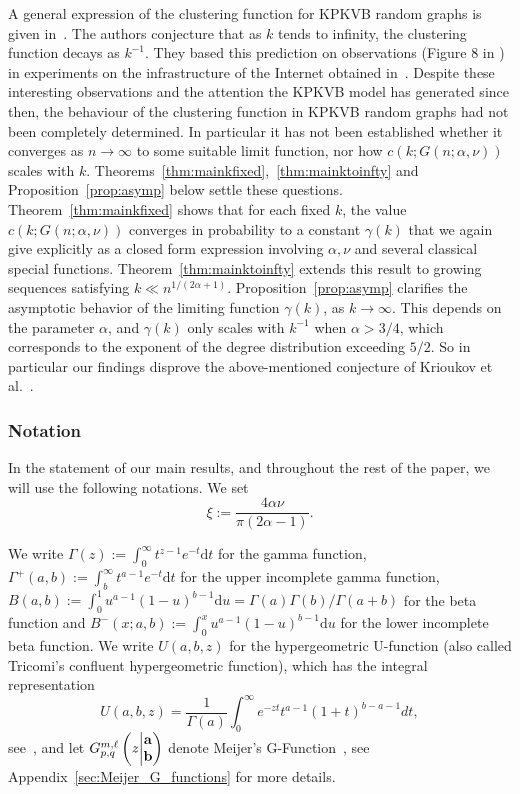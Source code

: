 A general expression of the clustering function for KPKVB random graphs is given in~\cite[Equation (59)]{krioukov2010hyperbolic}. 
The authors conjecture that as $k$ tends to infinity, the clustering function decays as $k^{-1}$. 
They based this prediction on observations (Figure 8 in \cite{krioukov2010hyperbolic}) in experiments on the infrastructure of the Internet obtained in~\cite{claffy2009internet}. Despite these interesting observations and the attention the KPKVB model has generated since then, the behaviour of the clustering function in KPKVB random graphs had not been completely determined. In particular it has not been established whether it converges as $n\to\infty$ to some suitable limit function, nor how $c(k;G(n; \alpha,\nu))$ scales with $k$. Theorems~\ref{thm:mainkfixed},~\ref{thm:mainktoinfty} and Proposition~\ref{prop:asymp} below settle these questions. Theorem~\ref{thm:mainkfixed} shows that for each fixed $k$, the value $c(k;G(n;\alpha,\nu))$ converges in probability to a constant $\gamma(k)$ that we again give explicitly as a closed form expression involving $\alpha,\nu$ and several classical special functions. Theorem~\ref{thm:mainktoinfty} extends this result to growing sequences satisfying $k \ll n^{1/(2\alpha+1)}$. Proposition~\ref{prop:asymp} clarifies the asymptotic behavior of the limiting function $\gamma(k)$, as $k\to\infty$. This depends on the parameter $\alpha$, and $\gamma(k)$ only scales with $k^{-1}$ when $\alpha > 3/4$, which corresponds to the exponent of the degree distribution exceeding $5/2$. 
So in particular our findings disprove the above-mentioned conjecture of Krioukov et al.~\cite{krioukov2010hyperbolic}.


\subsubsection*{Notation}

In the statement of our main results, and throughout the rest of the paper, we will use the following notations. 
We set 
$$\xi := \frac{4\alpha\nu}{\pi(2\alpha-1)}. $$

We write $\Gamma(z) := \int_0^\infty t^{z-1} e^{-t}\text{d}t$ for the gamma function, 
$\Gamma^+(a,b) := \int_b^\infty t^{a-1} e^{-t}\text{d}t$ for the upper incomplete gamma function, 
 $B(a,b) := \int_0^1 u^{a-1}(1-u)^{b-1}\text{d}u = \Gamma(a)\Gamma(b) / \Gamma(a+b)$ for the beta function and 
 $B^-(x ; a,b) := \int_0^x u^{a-1}(1-u)^{b-1}\text{d}u$ for the lower incomplete beta function. 
We write $U(a,b,z)$ for the hypergeometric U-function (also called Tricomi's confluent hypergeometric function), which 
has the integral representation 
\[
	U(a,b,z) = \frac{1}{\Gamma(a)} \int_0^\infty e^{-zt} t^{a-1} (1+t)^{b-a-1} dt,
\] 
see~\cite[p.255 Equation (2)]{erdelyi1953higher}, and let $\MeijerGnew{m}{\ell}{p}{q}{{\bf a}}{{\bf b}}{z}$ denote 
Meijer's G-Function~\cite{meijer1946gfunction}, see Appendix~\ref{sec:Meijer_G_functions} for more details.

